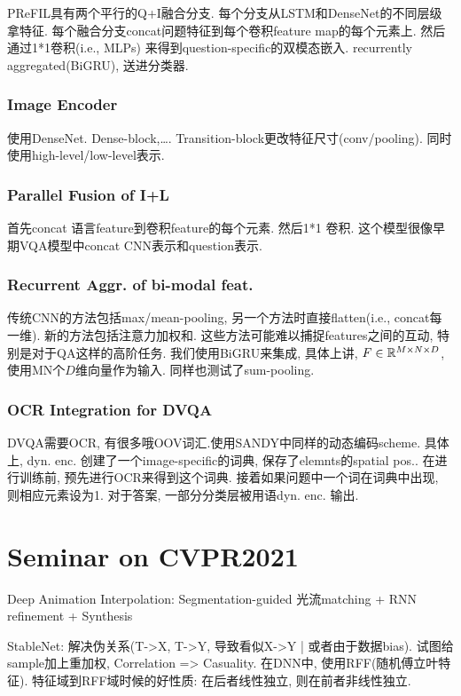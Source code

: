 \documentclass{article}
\begin{document}
PReFIL具有两个平行的Q+I融合分支. 每个分支从LSTM和DenseNet的不同层级拿特征. 每个融合分支concat问题特征到每个卷积feature map的每个元素上. 然后通过1*1卷积(i.e., MLPs) 来得到question-specific的双模态嵌入. recurrently aggregated(BiGRU), 送进分类器.

\subsubsection{Image Encoder}

使用DenseNet. Dense-block,\dots . Transition-block更改特征尺寸(conv/pooling). 同时使用high-level/low-level表示.

\subsubsection{Parallel Fusion of I+L}

首先concat 语言feature到卷积feature的每个元素. 然后1*1 卷积. 这个模型很像早期VQA模型中concat CNN表示和question表示. 

\subsubsection{Recurrent Aggr. of bi-modal feat.}

传统CNN的方法包括max/mean-pooling, 另一个方法时直接flatten(i.e., concat每一维). 新的方法包括注意力加权和. 这些方法可能难以捕捉features之间的互动, 特别是对于QA这样的高阶任务. 我们使用BiGRU来集成, 具体上讲, $F\in \mathbb{R}^{M\times N\times D}$, 使用MN个$D$维向量作为输入. 同样也测试了sum-pooling.

\subsubsection{OCR Integration for DVQA}

DVQA需要OCR, 有很多哦OOV词汇.使用SANDY中同样的动态编码scheme. 具体上, dyn. enc. 创建了一个image-specific的词典, 保存了elemnts的spatial pos.. 在进行训练前, 预先进行OCR来得到这个词典. 接着如果问题中一个词在词典中出现, 则相应元素设为1. 对于答案, 一部分分类层被用语dyn. enc. 输出.


\section{Seminar on CVPR2021}

Deep Animation Interpolation: Segmentation-guided 光流matching + RNN refinement + Synthesis

StableNet: 解决伪关系(T->X, T->Y, 导致看似X->Y | 或者由于数据bias). 试图给sample加上重加权, Correlation => Casuality. 在DNN中, 使用RFF(随机傅立叶特征). 特征域到RFF域时候的好性质: 在后者线性独立, 则在前者非线性独立.
\end{document}
